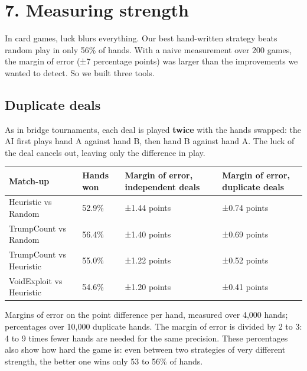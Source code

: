 \section*{7. Measuring strength}

In card games, luck blurs everything. Our best hand-written strategy beats random play in only 56\% of hands. With a naive measurement over 200 games, the margin of error (±7 percentage points) was larger than the improvements we wanted to detect. So we built three tools.

\subsection*{Duplicate deals}

As in bridge tournaments, each deal is played \textbf{twice} with the hands swapped: the AI first plays hand A against hand B, then hand B against hand A. The luck of the deal cancels out, leaving only the difference in play.

\begin{table}[htbp]\centering\small\begin{tabularx}{\linewidth}{llXX}\toprule

Match-up & Hands won & Margin of error, independent deals & Margin of error, duplicate deals \\\midrule

Heuristic vs Random & 52.9\% & ±1.44 points & ±0.74 points \\

TrumpCount vs Random & 56.4\% & ±1.40 points & ±0.69 points \\

TrumpCount vs Heuristic & 55.0\% & ±1.22 points & ±0.52 points \\

VoidExploit vs Heuristic & 54.6\% & ±1.20 points & ±0.41 points \\

\bottomrule\end{tabularx}\end{table}

Margins of error on the point difference per hand, measured over 4,000 hands; percentages over 10,000 duplicate hands. The margin of error is divided by 2 to 3: 4 to 9 times fewer hands are needed for the same precision. These percentages also show how hard the game is: even between two strategies of very different strength, the better one wins only 53 to 56\% of hands.

